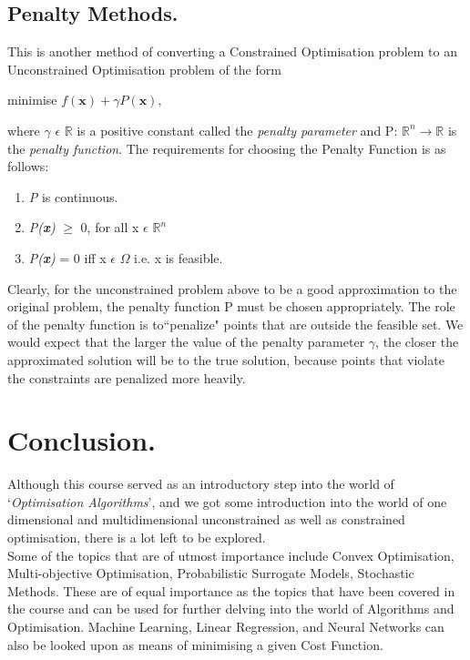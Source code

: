 \documentclass[12pt,a4paper,titlepage]{article}
\begin{document}
\subsection{Penalty Methods.}
This is another method of converting a Constrained Optimisation problem to an Unconstrained Optimisation problem of the form 
\begin{center}
    minimise $f(\boldsymbol{x})+\gamma P(\boldsymbol{x}),$
\end{center}
where $\gamma$ $\epsilon$ $\mathbb{R}$ is a positive constant called the \textit{penalty parameter} and P: $\mathbb{R}^{n} \rightarrow \mathbb{R}$ is the \textit{penalty function}. The requirements for choosing the Penalty Function is as follows:
\begin{enumerate}
    \item \textit{P} is continuous.
    \item \textit{P(\textbf{x})} $\geq$ 0, for all x $\epsilon$ $\mathbb{R}^{n}$
    \item \textit{P(\textbf{x})} = 0 iff x $\epsilon$ $\Omega$ i.e. x is feasible. 
\end{enumerate}
Clearly, for the unconstrained problem above to be a good approximation to the original problem, the penalty function P must be chosen appropriately. The role of the penalty function is to``penalize" points that are outside the feasible set.
We would expect that the larger the value of the penalty parameter $\gamma$, the closer the approximated solution will be to the true solution, because points that violate  the constraints are penalized more heavily.

\section{Conclusion.}
Although this course served as an introductory step into the world of `\textit{Optimisation Algorithms}', and we got some introduction into the world of one dimensional and multidimensional unconstrained as well as constrained optimisation, there is a lot left to be explored.\\
Some of the topics that are of utmost importance include Convex Optimisation, Multi-objective Optimisation, Probabilistic Surrogate Models, Stochastic Methods. These are of equal importance as the topics that have been covered in the course and can be used for further delving into the world of Algorithms and Optimisation. Machine Learning, Linear Regression, and Neural Networks can also be looked upon as means of minimising a given Cost Function.

%
%
\clearpage


\end{document}
